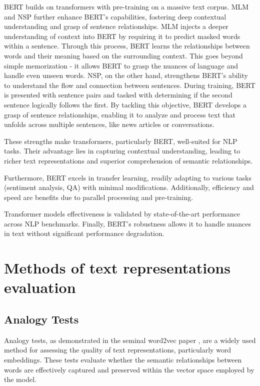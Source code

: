 BERT \cite{devlin2019bert} builds on transformers with pre-training on a massive text corpus.
\ac{MLM} and \ac{NSP} further enhance \ac{BERT}'s capabilities, fostering deep contextual understanding and grasp of sentence relationships.
\ac{MLM} injects a deeper understanding of context into \ac{BERT} by requiring it to predict masked words within a sentence.
Through this process, \ac{BERT} learns the relationships between words and their meaning based on the surrounding context.
This goes beyond simple memorization - it allows \ac{BERT} to grasp the nuances of language and handle even unseen words.
\ac{NSP}, on the other hand, strengthens \ac{BERT}'s ability to understand the flow and connection between sentences.
During training, \ac{BERT} is presented with sentence pairs and tasked with determining if the second sentence logically follows the first. 
By tackling this objective, \ac{BERT} develops a grasp of sentence relationships, enabling it to analyze and process text that unfolds across multiple sentences, like news articles or conversations.

These strengths make transformers, particularly \ac{BERT}, well-suited for \ac{NLP} tasks.
Their advantage lies in capturing contextual understanding, leading to richer text representations and superior comprehension of semantic relationships.

Furthermore, \ac{BERT} excels in transfer learning, readily adapting to various tasks (sentiment analysis, \ac{QA}) with minimal modifications.
Additionally, efficiency and speed are benefits due to parallel processing and pre-training.

Transformer models effectiveness is validated by state-of-the-art performance across \ac{NLP} benchmarks.
Finally, \ac{BERT}'s robustness allows it to handle nuances in text without significant performance degradation.

\section{Methods of text representations evaluation}

\subsection{Analogy Tests}

Analogy tests, as demonstrated in the seminal word2vec paper \cite{mikolov2013efficient}, are a widely used method for assessing the quality of text representations, particularly word embeddings.
These tests evaluate whether the semantic relationships between words are effectively captured and preserved within the vector space employed by the model.

